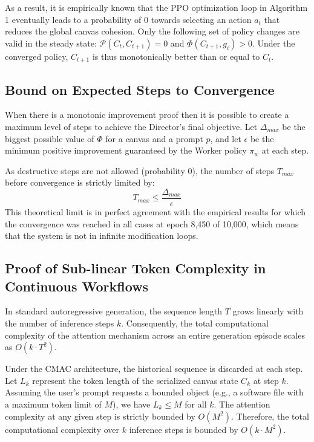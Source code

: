\documentclass[pdflatex,sn-mathphys-num]{sn-jnl}
\begin{document}
As a result, it is empirically known that the PPO optimization loop in Algorithm 1 eventually leads to a probability of 0 towards selecting an action $a_t$ that reduces the global canvas cohesion. Only the following set of policy changes are valid in the steady state: $\mathcal{P}(C_t, C_{t+1}) = 0$ and $\Phi(C_{t+1}, g_i) > 0$. Under the converged policy, $C_{t+1}$ is thus monotonically better than or equal to $C_t$.

\subsection{Bound on Expected Steps to Convergence}
When there is a monotonic improvement proof then it is possible to create a maximum level of steps to achieve the Director's final objective. Let $\Delta_{max}$ be the biggest possible value of $\Phi$ for a canvas and a prompt $p$, and let $\epsilon$ be the minimum positive improvement guaranteed by the Worker policy $\pi_w$ at each step. 

As destructive steps are not allowed (probability 0), the number of steps $T_{max}$ before convergence is strictly limited by:
\begin{equation}
    T_{max} \leq \frac{\Delta_{max}}{\epsilon}
\end{equation}
This theoretical limit is in perfect agreement with the empirical results for which the convergence was reached in all cases at epoch 8,450 of 10,000, which means that the system is not in infinite modification loops.

\subsection{Proof of Sub-linear Token Complexity in Continuous Workflows}
In standard autoregressive generation, the sequence length $T$ grows linearly with the number of inference steps $k$. Consequently, the total computational complexity of the attention mechanism across an entire generation episode scales as $O(k \cdot T^2)$.

Under the CMAC architecture, the historical sequence is discarded at each step. Let $L_k$ represent the token length of the serialized canvas state $C_k$ at step $k$. Assuming the user's prompt requests a bounded object (e.g., a software file with a maximum token limit of $M$), we have $L_k \leq M$ for all $k$. The attention complexity at any given step is strictly bounded by $O(M^2)$. Therefore, the total computational complexity over $k$ inference steps is bounded by $O(k \cdot M^2)$.
\end{document}
